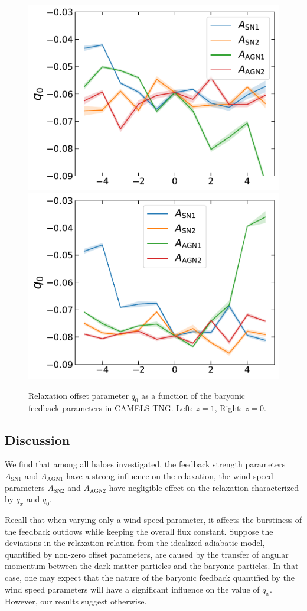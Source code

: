 \begin{figure}[htbp]
\centering
\includegraphics[width=0.49\linewidth]{plots/CAMELS_I_q0_sn18.pdf}
\includegraphics[width=0.49\linewidth]{plots/CAMELS_I_q0_sn33.pdf}
\caption{Relaxation offset parameter $q_0$ as a function of the baryonic feedback parameters in CAMELS-TNG. Left: $z=1$, Right: $z=0$.}
\label{fig:camels-q0q1}
\end{figure}

\subsection*{Discussion}

We find that among all haloes investigated, the feedback strength parameters $A_{\mathrm{SN1}}$ and $A_{\mathrm{AGN1}}$ have a strong influence on the relaxation,  
the wind speed parameters $A_{\mathrm{SN2}}$ and $A_{\mathrm{AGN2}}$ have negligible effect on the relaxation characterized by  $q_x$ and $q_0$.


Recall that when varying only a wind speed parameter, it affects the burstiness of the feedback outflows while keeping the overall flux constant. Suppose the deviations in the relaxation relation from the idealized adiabatic model, quantified by non-zero offset parameters, are caused by the transfer of angular momentum between the dark matter particles and the baryonic particles. In that case, one may expect that the nature of the baryonic feedback quantified by the wind speed parameters will have a significant influence on the value of $q_x$. However, our results suggest otherwise.

